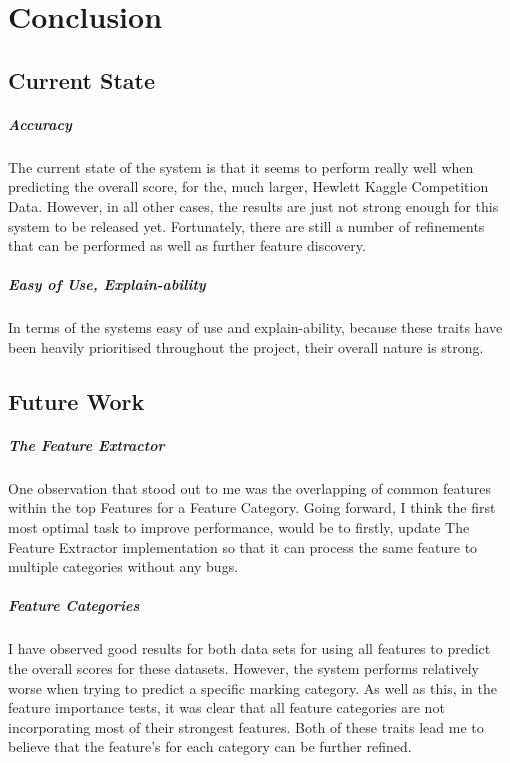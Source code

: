\chapter{Conclusion}\label{C:conclusion} 

\section{Current State}

\paragraph{Accuracy}
The current state of the system is that it seems to perform really well when predicting the overall score, for the, much larger, Hewlett Kaggle Competition Data. 
However, in all other cases, the results are just not strong enough for this system to be released yet. Fortunately, there are still a number of refinements that can be performed as well as further feature  discovery. 

\paragraph{Easy of Use, Explain-ability}
In terms of the systems easy of use and explain-ability, because these traits have been heavily prioritised throughout the project, their overall nature is strong. 

\section{Future Work}

\paragraph{The Feature Extractor}

One observation that  stood out to me was the overlapping of common features within the top Features for a Feature Category.  Going forward, I think the first most optimal task to improve performance, would be to firstly, update The Feature Extractor implementation so that it can process the same feature to multiple categories without any bugs. 

\paragraph{Feature Categories}

I have observed good results for both data sets for using all features to predict the overall scores for these datasets. However, the system performs relatively worse when trying to predict a specific marking category. As well as this, in the feature importance tests, it was clear that all feature categories are not incorporating most of their strongest features. Both of these traits lead me to believe that the feature's for each category can be further refined. 

